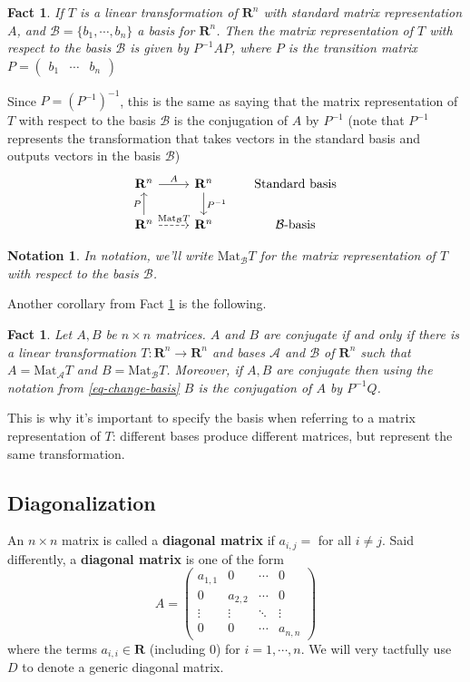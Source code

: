 \documentclass[12pt]{article}
\numberwithin{equation}{subsection}
\numberwithin{figure}{subsection}
\newtheorem{fact}[subsection]{Fact}
\theoremstyle{note}
\newtheorem{notation}[subsection]{Notation}
\newcommand{\R}{\mathbf{R}}
\newcommand\Mat{\mathrm{Mat}}
\begin{document}
\begin{fact} \label{fact-conj} If $T$ is a linear transformation of $\R^n$ with standard matrix representation $A$, and $\mathcal{B}=\{b_1,\cdots,b_n\}$ a basis for $\mathbf{R}^n$. Then the matrix representation of $T$ with respect to the basis $\mathcal{B}$ is given by $P^{-1}AP$, where $P$ is the transition matrix $P=\begin{pmatrix} b_1  & \cdots & b_n\end{pmatrix} $
\end{fact}
Since $P=(P^{-1})^{-1}$, this is the same as saying that the matrix representation of $T$ with respect to the basis $\mathcal{B}$ is the conjugation of $A$ by $P^{-1}$ (note that $P^{-1}$ represents the transformation that takes vectors in the standard basis and outputs vectors in the basis $\mathcal{B}$)
\begin{equation}
\begin{tikzcd}
\R^n \arrow{r}{A}&  \R^n \arrow{d}{P^{-1}} & \text{Standard basis} \\
\R^n \arrow{u}{P} \arrow[dashed]{r}{\Mat_{\mathcal{B}}T} & \R^n & \text{$\mathcal{B}$-basis}
\end{tikzcd} 
\end{equation}

\begin{notation}
In notation, we'll write $\Mat_{\mathcal{B}}T$ for the matrix representation of $T$ with respect to the basis $\mathcal{B}$. 
\end{notation}
Another corollary from Fact \ref{fact-conj} is the following.

\begin{fact}Let $A,B$ be $n\times n$ matrices.  $A$ and $B$ are conjugate if and only if there is a linear transformation $T\colon\R^n\to\R^n$ and bases $\mathcal{A}$ and $\mathcal{B}$ of $\R^n$ such that $A=\Mat_{\mathcal{A}}T$ and $B=\Mat_{\mathcal{B}}T$. Moreover, if $A,B$ are conjugate then using the notation from \eqref{eq-change-basis} $B$ is the conjugation of $A$ by $P^{-1}Q$.
\end{fact}

This is why it's important to specify the basis when referring to a matrix representation of $T$: different bases produce different matrices, but represent the same transformation.
\subsection{Diagonalization}

An $n\times n$ matrix is called a \textbf{diagonal matrix} if $a_{i,j}=$ for all $i\neq j$. Said differently, a \textbf{diagonal matrix} is one of the form 
\begin{equation}  A=\begin{pmatrix} a_{1,1} & 0 &  \cdots & 0 \\
0 & a_{2,2} & \cdots & 0 \\
\vdots &  \vdots & \ddots & \vdots \\
0 & 0 &  \cdots & a_{n,n} \end{pmatrix}\end{equation}
where the terms $a_{i,i}\in\R$ (including $0$) for $i=1,\cdots,n$. We will very tactfully use $D$ to denote a generic diagonal matrix. 
\end{document}

